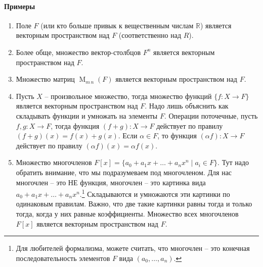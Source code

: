 \paragraph{Примеры}
\begin{enumerate}
\item Поле $F$ (или кто больше привык к вещественным числам $\mathbb R$) является векторным пространством над $F$ (соответственно над $R$).

\item Более обще, множество вектор-столбцов $F^n$ является векторным пространством над $F$.

\item Множество матриц $\operatorname{M}_{m\,n}(F)$ является векторным пространством над $F$.

\item Пусть $X$ -- произвольное множество, тогда множество функций $\{f\colon X\to F\}$ является векторным пространством над $F$. Надо лишь объяснить как складывать функции и умножать на элементы $F$. Операции поточечные, пусть $f,g\colon X\to F$, тогда функция $(f+g)\colon X\to F$ действует по правилу $(f+g)(x) = f(x) + g(x)$. Если $\alpha \in F$, то функция $(\alpha f)\colon X\to F$ действует по правилу $(\alpha f)(x) = \alpha f(x)$.

\item Множество многочленов $F[x] = \{a_0+a_1x + \ldots + a_n x^n\mid a_i \in F\}$. Тут надо обратить внимание, что мы подразумеваем под многочленом. Для нас многочлен -- это НЕ функция, многочлен -- это картинка вида $a_0 + a_1 x + \ldots + a_n x^n$.\footnote{Для любителей формализма, можете считать, что многочлен -- это конечная последовательность элементов $F$ вида $(a_0,\ldots,a_n)$.} Складываются и умножаются эти картинки по одинаковым правилам. Важно, что две такие картинки равны тогда и только тогда, когда у них равные коэффициенты. Множество всех многочленов $F[x]$ является векторным пространством над $F$.
\end{enumerate}

